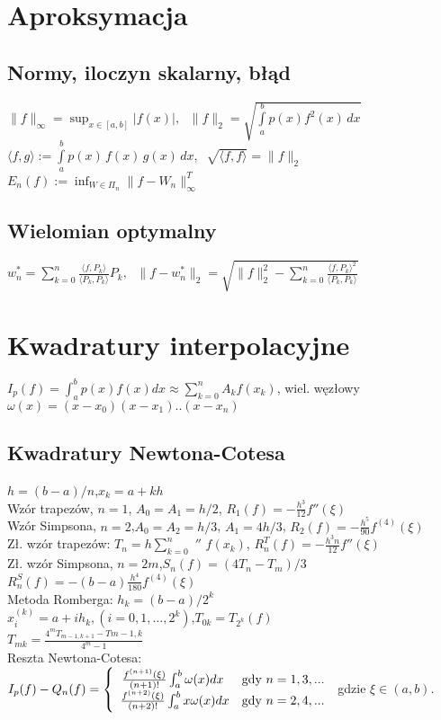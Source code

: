 \documentclass[a4paper,twocolumn]{article}
\begin{document}
\section{Aproksymacja}

\subsection{Normy, iloczyn skalarny, błąd}
$\|f\|_\infty = \sup_{x \in [a,b]}|f(x)|,\;$
$\|f\|_2 = \sqrt{\int\limits_a^b p(x)f^2(x)\,dx}$\\
$\langle f, g \rangle := \int\limits_a^b p(x)\,f(x)\,g(x)\,dx,\;\; \sqrt{\langle f, f \rangle} = \|f\|_2$\\
$E_n(f) := \inf_{W \in \Pi_n} \|f-W_n\|_\infty^T$

\subsection{Wielomian optymalny}

$w_n^* = \sum_{k=0}^n \frac{\langle f, P_k \rangle}{\langle P_k, P_k \rangle} P_k,\;$
$\|f-w_n^*\|_2 = \sqrt{\|f\|_2^2 - \sum_{k=0}^n \frac{{\langle f, P_k \rangle}^2}{\langle P_k, P_k \rangle}}$

\section{Kwadratury interpolacyjne}
\noindent $I_p(f) = \int_{a}^{b}p(x)f(x)dx \approx \sum_{k=0}^{n}A_kf(x_k)$, wiel. węzłowy $\omega(x) = (x-x_0)(x-x_1)..(x-x_n)$

\subsection{Kwadratury Newtona-Cotesa}
$h=(b-a)/n$,\quad $x_k=a+kh$\\
Wzór trapezów,  $n=1$, $A_0=A_1=h/2$, $R_1(f)=-\frac{h^3}{12}f''(\xi)$\\
Wzór Simpsona, $n=2$,$A_0=A_2=h/3$, $A_1=4h/3$, $R_2(f)=-\frac{h^5}{90}f^{(4)}(\xi)$\\
Zł. wzór trapezów: $T_n=h\sum_{k=0}^{n}$ $''$ $f(x_k)$,
$R_n^T(f)=-\frac{h^3n}{12}f''(\xi)$\\
Zł. wzór Simpsona, $n=2m$,\quad $S_n(f)=(4T_n-T_m)/3$\\
$R_n^S(f)=-(b-a)\frac{h^4}{180}f^{(4)}(\xi)$\\
Metoda Romberga: $h_k=(b-a)/2^k$\\
$x_i^(k)=a+ih_k,(i=0,1,\dots,2^k)$,\quad $T_{0k}=T_{2^k}(f)$\\
$T_{mk}=\frac{4^mT_{m-1,k+1} - T{m-1,k}}{4^m-1}$\\
Reszta Newtona-Cotesa:\\
\noindent$  I_p(f) - Q_n(f) = \left\{ \begin{array}{ll}
\left.\frac{f^{(n+1)}(\xi)}{(n+1)!}\int_{a}^{b} \omega(x) dx
\right. & \textrm{gdy $ n = 1,3,... $}\\
\frac{f^{(n+2)}(\xi)}{(n+2)!}\int_{a}^{b} x\omega(x) dx & \textrm{gdy $ n = 2,4,... $}
\end{array} \right.
$
gdzie $\xi \in (a, b).$
\end{document}
